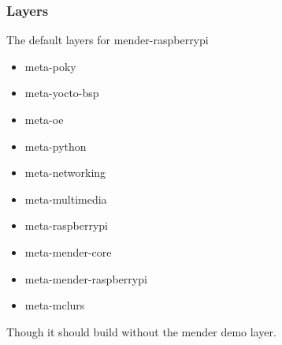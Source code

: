 \documentclass[../../main.tex]{subfiles}
\begin{document}
\subsubsection{Layers}%
\label{ssub:layers}

The default layers for mender-raspberrypi
\begin{itemize}
	\item meta-poky
	\item meta-yocto-bsp
	\item meta-oe
	\item meta-python
	\item meta-networking
	\item meta-multimedia
	\item meta-raspberrypi
	\item meta-mender-core
	\item meta-mender-raspberrypi
	\item meta-mclurs
\end{itemize}
Though it should build without the mender demo layer.
\end{document}
